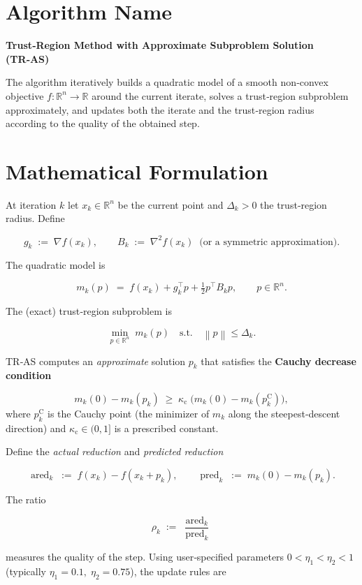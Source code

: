 \documentclass{article}
\newcommand{\norm}[1]{\left\lVert#1\right\rVert}
\newcommand{\R}{\mathbb{R}}
\begin{document}
\section*{Algorithm Name}
\textbf{Trust‑Region Method with Approximate Subproblem Solution (TR‑AS)}  

The algorithm iteratively builds a quadratic model of a smooth non‑convex objective
\(f:\R^{n}\rightarrow\R\) around the current iterate, solves a trust‑region subproblem
approximately, and updates both the iterate and the trust‑region radius according to
the quality of the obtained step.

\section*{Mathematical Formulation}
At iteration \(k\) let \(x_k\in\R^{n}\) be the current point and \(\Delta_k>0\) the trust‑region radius.  
Define

\[
g_k \;:=\; \nabla f(x_k), \qquad
B_k \;:=\; \nabla^{2} f(x_k) \;\; \text{(or a symmetric approximation)} .
\]

The quadratic model is

\[
m_k(p) \;=\; f(x_k) + g_k^{\top}p + \tfrac12 p^{\top}B_k p ,\qquad p\in\R^{n}.
\]

The (exact) trust‑region subproblem is

\[
\min_{p\in\R^{n}}\; m_k(p) \quad \text{s.t.}\quad \norm{p}\le \Delta_k .
\tag{TR}
\]

TR‑AS computes an \emph{approximate} solution \(p_k\) that satisfies the
\textbf{Cauchy decrease condition}

\[
m_k(0)-m_k(p_k) \;\ge\; \kappa_{\mathrm{c}}\;
\bigl(m_k(0)-m_k(p_k^{\mathrm{C}})\bigr),
\tag{1}
\]
where \(p_k^{\mathrm{C}}\) is the Cauchy point (the minimizer of \(m_k\) along the
steepest‑descent direction) and \(\kappa_{\mathrm{c}}\in(0,1]\) is a prescribed constant.

Define the \emph{actual reduction} and \emph{predicted reduction}

\[
\operatorname{ared}_k \;:=\; f(x_k)-f(x_k+p_k),\qquad
\operatorname{pred}_k \;:=\; m_k(0)-m_k(p_k).
\]

The ratio

\[
\rho_k \;:=\; \frac{\operatorname{ared}_k}{\operatorname{pred}_k}
\tag{2}
\]

measures the quality of the step.  Using user‑specified parameters
\(0<\eta_1<\eta_2<1\) (typically \(\eta_1=0.1,\;\eta_2=0.75\)),
the update rules are
\end{document}
